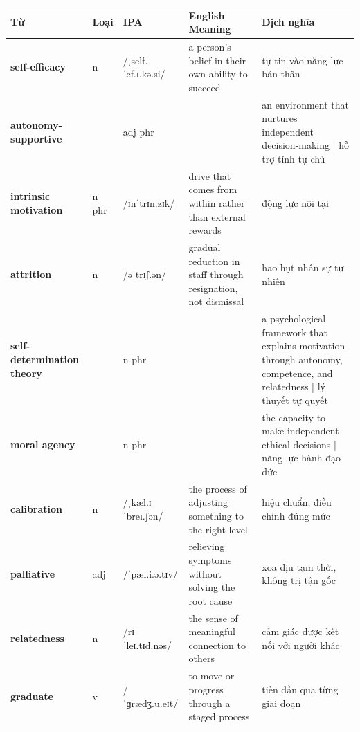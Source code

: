 \vspace{0.8em}
\begin{center}
\renewcommand{\arraystretch}{1.65}
\begin{tabularx}{\textwidth}{|V{0.22\textwidth}|C{0.07\textwidth}|I{0.20\textwidth}|Y|V{0.18\textwidth}|}
\hline
{}
\textbf{Từ} & \textbf{Loại} & \textbf{IPA} & \textbf{English Meaning} & \textbf{Dịch nghĩa} \\
\hline
\textbf{self-efficacy} & n & /ˌself.ˈef.ɪ.kə.si/ & a person's belief in their own ability to succeed & tự tin vào năng lực bản thân \\ \hline
\textbf{autonomy-supportive} & & adj phr & & an environment that nurtures independent decision-making | hỗ trợ tính tự chủ \\ \hline
\textbf{intrinsic motivation} & n phr & /ɪnˈtrɪn.zɪk/ & drive that comes from within rather than external rewards & động lực nội tại \\ \hline
\textbf{attrition} & n & /əˈtrɪʃ.ən/ & gradual reduction in staff through resignation, not dismissal & hao hụt nhân sự tự nhiên \\ \hline
\textbf{self-determination theory} & & n phr & & a psychological framework that explains motivation through autonomy, competence, and relatedness | lý thuyết tự quyết \\ \hline
\textbf{moral agency} & & n phr & & the capacity to make independent ethical decisions | năng lực hành đạo đức \\ \hline
\textbf{calibration} & n & /ˌkæl.ɪˈbreɪ.ʃən/ & the process of adjusting something to the right level & hiệu chuẩn, điều chỉnh đúng mức \\ \hline
\textbf{palliative} & adj & /ˈpæl.i.ə.tɪv/ & relieving symptoms without solving the root cause & xoa dịu tạm thời, không trị tận gốc \\ \hline
\textbf{relatedness} & n & /rɪˈleɪ.tɪd.nəs/ & the sense of meaningful connection to others & cảm giác được kết nối với người khác \\ \hline
\textbf{graduate} & v & /ˈɡrædʒ.u.eɪt/ & to move or progress through a staged process & tiến dần qua từng giai đoạn \\ \hline
\end{tabularx}
\end{center}

\newpage

